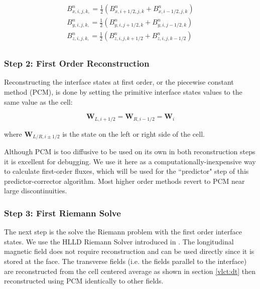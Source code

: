 \begin{equation}
    \begin{aligned}
        B^n_{x,i,j,k,} = \frac{1}{2} \left( B^n_{x,i+1/2,j,k} + B^n_{x,i-1/2,j,k} \right) \\
        B^n_{y,i,j,k,} = \frac{1}{2} \left( B^n_{y,i,j+1/2,k} + B^n_{y,i,j-1/2,k} \right) \\
        B^n_{z,i,j,k,} = \frac{1}{2} \left( B^n_{z,i,j,k+1/2} + B^n_{z,i,j,k-1/2} \right) \\
    \end{aligned}
\end{equation}

\subsubsection{Step 2: First Order Reconstruction}
\label{vlct:first-order-reconstruction}

Reconstructing the interface states at first order, or the piecewise constant method (PCM), is done by setting the primitive interface states values to the same value as the cell:

\begin{equation}
    \boldsymbol{W}_{L, i+1/2} = \boldsymbol{W}_{R, i-1/2} = \boldsymbol{W}_{i}
\end{equation}

\noindent where $ \boldsymbol{W}_{L/R, i\pm1/2} $ is the state on the left or right side of the cell.

Although PCM is too diffusive to be used on its own in both reconstruction steps it is excellent for debugging. We use it here as a computationally-inexpensive way to calculate first-order fluxes, which will be used for the ``predictor" step of this predictor-corrector algorithm. Most higher order methods revert to PCM near large discontinuities.

\subsubsection{Step 3: First Riemann Solve}
\label{vlct:first-riemann-solve}

The next step is the solve the Riemann problem with the first order interface states. We use the HLLD Riemann Solver introduced in \cite{hlld_2005}. The longitudinal magnetic field does not require reconstruction and can be used directly since it is stored at the face. The transverse fields (i.e. the fields parallel to the interface) are reconstructed from the cell centered average as shown in section \ref{vlct:dt} then reconstructed using PCM identically to other fields.

